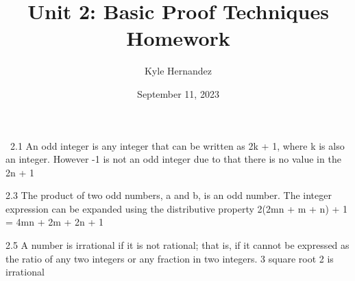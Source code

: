 \documentclass{article}
\title{Unit 2: Basic Proof Techniques Homework}
\author{Kyle Hernandez}
\date{September 11, 2023}
\begin{document}
\maketitle
\
2.1  An odd integer is any integer that can be written as 2k + 1, where k is also an integer. However  -1 is not an odd integer due to that there is no value in the 2n + 1



2.3  The product of two odd numbers, a and b, is an odd number. The integer expression can be expanded using the distributive property 2(2mn + m + n) + 1 =  4mn + 2m + 2n + 1 


2.5  A number is irrational if it is not rational; that is, if it cannot be expressed as the ratio of any two integers or any fraction in two integers. 3 square root 2 is irrational 
\end{document}
